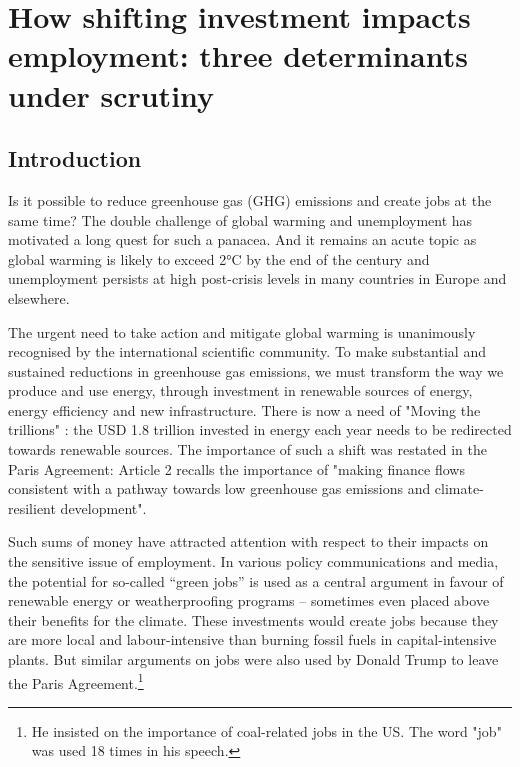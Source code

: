 \chapter{How shifting investment impacts employment: three determinants under scrutiny} \label{chap:mechanisms}

\section{Introduction} \label{Introduction}

Is it possible to reduce greenhouse gas (GHG) emissions and create jobs at the same time? The double challenge of global warming and unemployment has motivated a long quest for such a panacea. And it remains an acute topic as global warming is likely to exceed 2°C by the end of the century and unemployment persists at high post-crisis levels in many countries in Europe and elsewhere.

The urgent need to take action and mitigate global warming is unanimously recognised by the international scientific community. To make substantial and sustained reductions in greenhouse gas emissions, we must transform the way we produce and use energy, through investment in renewable sources of energy, energy efficiency and new infrastructure. There is now a need of "Moving the trillions" \citep{Sirkis2015}: the USD 1.8 trillion invested in energy each year \citep{IEAWIR2016} needs to be redirected towards renewable sources. The importance of such a shift was restated in the Paris Agreement: Article 2 recalls the importance of "making finance flows consistent with a pathway towards low greenhouse gas emissions and climate-resilient development". 

Such sums of money have attracted attention with respect to their impacts on the sensitive issue of employment. In various policy communications and media, the potential for so-called “green jobs” is used as a central argument in favour of renewable energy or weatherproofing programs – sometimes even placed above their benefits for the climate. These investments would create jobs because they are more local and labour-intensive than burning fossil fuels in capital-intensive plants. But similar arguments on jobs were also used by Donald Trump to leave the Paris Agreement.\footnote{He insisted on the importance of coal-related jobs in the US. The word "job" was used 18 times in his speech.}

